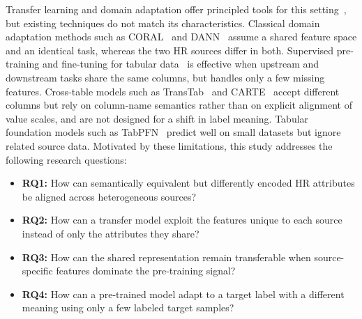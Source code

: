 \documentclass[runningheads]{llncs}
\begin{document}
Transfer learning and domain adaptation offer principled tools for this setting~\cite{pan2010,zhuang2021}, but existing techniques do not match its characteristics. Classical domain adaptation methods such as CORAL~\cite{sun2016} and DANN~\cite{ganin2015} assume a shared feature space and an identical task, whereas the two HR sources differ in both. Supervised pre-training and fine-tuning for tabular data~\cite{levin2023} is effective when upstream and downstream tasks share the same columns, but handles only a few missing features. Cross-table models such as TransTab~\cite{wang2022} and CARTE~\cite{kim2024} accept different columns but rely on column-name semantics rather than on explicit alignment of value scales, and are not designed for a shift in label meaning. Tabular foundation models such as TabPFN~\cite{hollmann2025} predict well on small datasets but ignore related source data. Motivated by these limitations, this study addresses the following research questions:
\begin{itemize}
\item \textbf{RQ1:} How can semantically equivalent but differently encoded HR attributes be aligned across heterogeneous sources?
\item \textbf{RQ2:} How can a transfer model exploit the features unique to each source instead of only the attributes they share?
\item \textbf{RQ3:} How can the shared representation remain transferable when source-specific features dominate the pre-training signal?
\item \textbf{RQ4:} How can a pre-trained model adapt to a target label with a different meaning using only a few labeled target samples?
\end{itemize}
\end{document}
